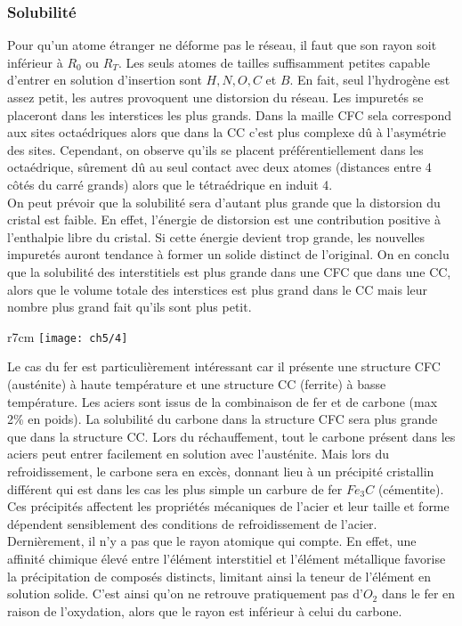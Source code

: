 	\subsubsection{Solubilité}
		Pour qu'un atome étranger ne déforme pas le réseau, il faut que son rayon soit inférieur à $R_0$ ou $R_T$. Les seuls atomes de tailles suffisamment petites capable d'entrer en solution d'insertion sont $H,N,O,C$ et $B$. En fait, seul l'hydrogène est assez petit, les autres provoquent une distorsion du réseau. Les impuretés se placeront dans les interstices les plus grands. Dans la maille CFC sela correspond aux sites octaédriques alors que dans la CC c'est plus complexe dû à l'asymétrie des sites. Cependant, on observe qu'ils se placent préférentiellement dans les octaédrique, sûrement dû au seul contact avec deux atomes (distances entre 4 côtés du carré grands) alors que le tétraédrique en induit 4. \\
	On peut prévoir que la solubilité sera d'autant plus grande que la distorsion du cristal est faible. En effet, l'énergie de distorsion est une contribution positive à l'enthalpie libre du cristal. Si cette énergie devient trop grande, les nouvelles impuretés auront tendance à former un solide distinct de l'original. On en conclu que la solubilité des interstitiels est plus grande dans une CFC que dans une CC, alors que le volume totale des interstices est plus grand dans le CC mais leur nombre plus grand fait qu'ils sont plus petit. \\
		
		\begin{wrapfigure}[9]{r}{7cm}
	\vspace{-10mm}
	\texttt{[image: ch5/4]}
	\end{wrapfigure}
		Le cas du fer est particulièrement intéressant car il présente une structure CFC (austénite) à haute température et une structure CC (ferrite) à basse température. Les aciers sont issus de la combinaison de fer et de carbone (max 2\% en poids). La solubilité du carbone dans la structure CFC sera plus grande que dans la structure CC. Lors du réchauffement, tout le carbone présent dans les aciers peut entrer facilement en solution avec l'austénite. Mais lors du refroidissement, le carbone sera en excès, donnant lieu à un précipité cristallin différent qui est dans les cas les plus simple un carbure de fer $Fe_3C$ (cémentite). Ces précipités affectent les propriétés mécaniques de l'acier et leur taille et forme dépendent sensiblement des conditions de refroidissement de l'acier. \\
		Dernièrement, il n'y a pas que le rayon atomique qui compte. En effet, une affinité chimique élevé entre l'élément interstitiel et l'élément métallique favorise la précipitation de composés distincts, limitant ainsi la teneur de l'élément en solution solide. C'est ainsi qu'on ne retrouve pratiquement pas d'$O_2$ dans le fer en raison de l'oxydation, alors que le rayon est inférieur à celui du carbone. 

